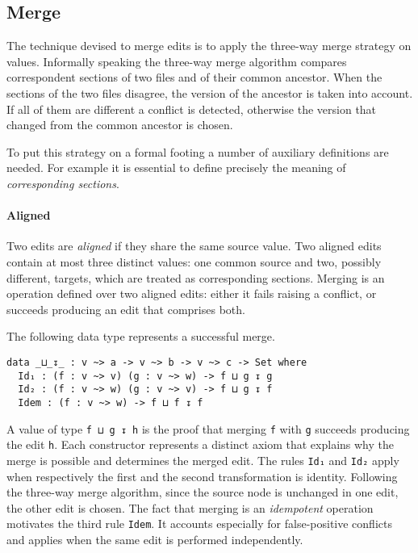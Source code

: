 \documentclass[../Thesis.tex]{subfiles}
\begin{document}
	\subsection{Merge}	
	\label{subsec:Merge}
	The technique devised to merge edits is to apply the three-way
	merge strategy on values. 
	Informally speaking the three-way merge algorithm 	
	compares correspondent sections of two files and of their common 
	ancestor.
	When the sections of the two files disagree, the version of the ancestor
	is taken into account. If all of them are different a conflict is detected,
	otherwise the version that changed from the common ancestor is chosen.
	
	To put this strategy on a formal footing a number of auxiliary definitions 
	are needed. For example it is essential to define precisely the meaning 
	of \emph{corresponding sections}. 
	
	\paragraph{Aligned}
	Two edits are \emph{aligned} if they share the same source value.	
	Two aligned edits contain at most three distinct values: 
	one common source and two, 	possibly different, targets, which 
	are treated as corresponding sections.
	Merging is an operation defined over two aligned edits:
	either it fails raising a conflict, or succeeds producing an edit that 
	comprises both. 

	The following data type represents a successful merge.
\begin{verbatim}	
data _⊔_↧_ : v ~> a -> v ~> b -> v ~> c -> Set where
  Id₁ : (f : v ~> v) (g : v ~> w) -> f ⊔ g ↧ g
  Id₂ : (f : v ~> w) (g : v ~> v) -> f ⊔ g ↧ f
  Idem : (f : v ~> w) -> f ⊔ f ↧ f
\end{verbatim}

	A value of type \texttt{f ⊔ g ↧ h} is the proof that merging \texttt{f} with
	\texttt{g} succeeds producing the edit \texttt{h}.
	Each constructor represents a distinct axiom that explains why
	the merge is possible and determines the merged edit.
	The rules \texttt{Id₁} and \texttt{Id₂} apply when 
	respectively the first and the second transformation is identity.
	Following the three-way merge algorithm, since the source node
	is unchanged in one edit, the other edit is chosen.
	The fact that merging is an \emph{idempotent} operation motivates the 
	third rule \texttt{Idem}.
	It accounts especially for false-positive conflicts and applies 
	when the same edit is performed independently.
	
\end{document}
